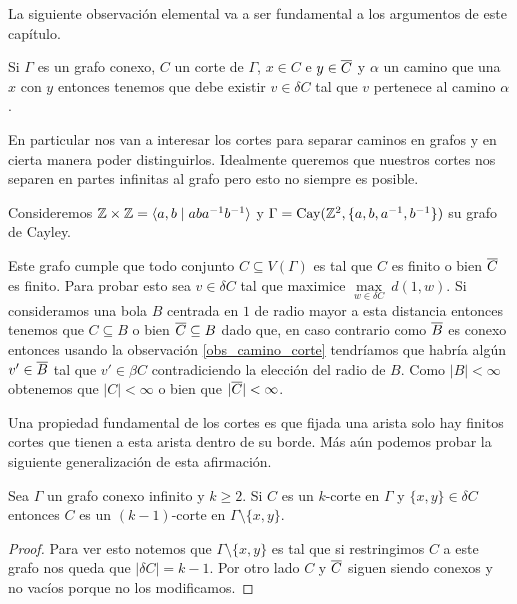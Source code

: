 \documentclass[tesis.tex]{subfiles}
\begin{document}
La siguiente observación elemental va a ser fundamental a los argumentos de este capítulo.

\begin{obs}\label{obs_camino_corte}
	Si $\Gamma$ es un grafo conexo, $C$ un corte de $\Gamma$, $x \in C$ e $y \in \overline C$ y 
	$\alpha$ un camino que una $x$ con $y$ 
	entonces tenemos que debe existir $v \in \delta C$ tal que $v$ pertenece al camino $\alpha$.
\end{obs} 


En particular nos van a interesar los cortes para separar caminos en grafos y en cierta manera poder distinguirlos.
Idealmente queremos que nuestros cortes nos separen en partes infinitas al grafo pero esto no siempre es posible.

\begin{ej}
	Consideremos $\mathbb{Z} \times \mathbb{Z} = \langle a,b \mid aba^{-1}b^{-1} \rangle$ y 
	$\Gamma = \text{Cay}(\mathbb{Z}^2, \{ a, b,a^{-1},b^{-1} \})$ su grafo de Cayley.
	
	Este grafo cumple que todo conjunto $C \subseteq V(\Gamma)$ es tal que $C$ es finito o bien $\overline C$ es finito.
	Para probar esto sea $v \in \delta C$ tal que
	maximice $\underset{w \in \delta C}{\max} \ d(1,w)$.
	Si consideramos una bola $B$ centrada en $1$ de radio mayor a esta distancia entonces tenemos que $C \subseteq B$ o bien $\overline C \subseteq B$ dado que, en caso contrario como $\overline B$ es conexo entonces usando la observación \ref{obs_camino_corte} tendríamos que habría algún $v' \in \overline B$ tal que $v' \in \beta C$ contradiciendo la elección del radio de $B$.
	Como $|B| < \infty$ obtenemos que $|C| < \infty$ o bien que $|\overline C| < \infty$.
\end{ej}

Una propiedad fundamental de los cortes es que fijada una arista solo hay finitos cortes que tienen a esta arista dentro de su borde.	
Más aún podemos probar la siguiente generalización de esta afirmación.
\begin{lema}\label{obs_kCorte_restriccion}
	Sea $\Gamma$ un grafo conexo infinito y $k \ge 2$.
	Si $C$ es un $k$-corte en $\Gamma$ y $\{ x,y  \} \in \delta C$ entonces $C$ es un $(k-1)$-corte en $ \Gamma \setminus \{ x,y \} $.
\end{lema}

\begin{proof}
	Para ver esto notemos que $\Gamma \setminus \{ x,y \}$ es tal que si restringimos $C$ a este grafo nos queda que $|\delta C| = k-1$.
	Por otro lado $C$ y $\overline C$ siguen siendo conexos y no vacíos porque no los modificamos.
\end{proof}
\end{document}
